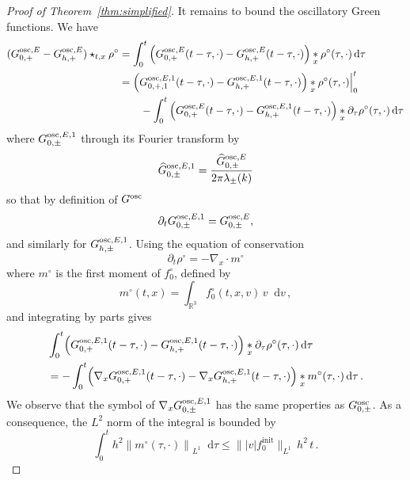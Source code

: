 \documentclass[a4paper,12pt]{amsart} %
\theoremstyle{plain}
\theoremstyle{definition}
\newcommand		{\RR}		{\mathbb R}			%
\newcommand		{\R}		{\RR}
\newcommand		{\Rd}		{\R^3}
\newcommand		{\lt}			{\left}				%
\newcommand		{\rt}			{\right}			%
\renewcommand	{\(}			{\lt(}
\renewcommand	{\)}			{\rt)}
\newcommand		{\n}[1]			{\lt\lvert{#1}\rt\rvert}	%
\newcommand		{\nrm}[1]		{\lt\lVert{#1}\rt\rVert}		%
\newcommand		{\snrm}[1]		{\lVert #1\rVert}
\newcommand		{\Nrm}[2]		{\nrm{#1}_{#2}}
\newcommand		{\sNrm}[2]		{\snrm{#1}_{#2}}
\renewcommand		{\d}		{\mathop{}\!\mathrm{d}}		%
\newcommand			{\Dx}		{\nabla_x}
\newcommand		{\intd}			{\int_{\Rd}}
\newcommand		{\init}			{\mathrm{init}}
\newcommand		{\Gosc}			{G^{\textnormal{osc}}}
\newcommand		{\GoscE}		{G^{\textnormal{osc},E}}
\newcommand		{\hatG}			{\widehat{G}}
\newcommand		{\hatGoscE}		{\hatG^{\textnormal{osc},E}}
\begin{document}
\begin{proof}[Proof of Theorem~\ref{thm:simplified}]
		It remains to bound the oscillatory Green functions. We have
		\begin{align*}
			(\GoscE_{0,+} - \GoscE_{h,+}) \star_{t,x} \rho^\circ
			&= \int_0^t \lt( \GoscE_{0,+}(t-\tau,\cdot) - \GoscE_{h,+}(t - \tau,\cdot) \rt) \underset{x}{*} \rho^\circ(\tau,\cdot) \d\tau
			\\
			&= \lt( G^{\textnormal{osc},E,1}_{0,+,1}(t-\tau,\cdot) - G^{\textnormal{osc},E,1}_{h,+}(t - \tau,\cdot) \rt) \underset{x}{*} \rho^\circ(\tau,\cdot)\Bigr|_0^t
			\\
			&\qquad - \int_0^t \lt( \GoscE_{0,+}(t-\tau,\cdot) - G^{\textnormal{osc},E,1}_{h,+}(t - \tau,\cdot) \rt) \underset{x}{*} \partial_\tau \rho^\circ(\tau,\cdot) \d\tau
		\end{align*}
		where $G^{\textnormal{osc},E,1}_{0,\pm}$ through its Fourier transform by
		\begin{equation*}
			\widehat G^{\textnormal{osc},E,1}_{0,\pm} = \frac{\hatGoscE_{0,\pm}}{2 \pi \lambda_\pm(k)}
		\end{equation*}
		so that by definition of $\Gosc$
		\begin{equation*}
			\partial_t G^{\textnormal{osc},E,1}_{0,\pm} = \GoscE_{0,\pm}, 
		\end{equation*}
		and similarly for $G^{\textnormal{osc},E,1}_{h,\pm}$. Using the equation of conservation
		\begin{equation*}
			\partial_t \rho^\circ = - \Dx \cdot m^\circ
		\end{equation*}
		where $m^\circ$ is the first moment of $f_0^\circ$, defined by
		\begin{equation*}
			m^\circ(t,x) = \intd f_0^\circ(t,x,v) \, v \d v \, ,
		\end{equation*}
		and integrating by parts gives
		\begin{align*}
			&\int_0^t \Bigl( G^{\textnormal{osc},E,1}_{0,+}(t-\tau,\cdot) - G^{\textnormal{osc},E,1}_{h,+}(t - \tau,\cdot) \Bigr) \underset{x}{*} \partial_\tau \rho^\circ(\tau,\cdot) \d\tau
			\\
			&= - \int_0^t \Bigl( \Dx G^{\textnormal{osc},E,1}_{0,+}(t-\tau,\cdot) - \Dx G^{\textnormal{osc},E,1}_{h,+}(t - \tau,\cdot) \Bigr) \underset{x}{*} m^\circ(\tau,\cdot) \d\tau \, .
		\end{align*}
		We observe that the symbol of $\Dx G^{\textnormal{osc},E,1}_{0,\pm}$ has the same properties as $\Gosc_{0,\pm}$. As a consequence, the $L^2$ norm of the integral is bounded by
		\begin{equation*}
			\int_0^t h^2 \Nrm{m^\circ(\tau,\cdot)}{L^1} \d\tau \leq \sNrm{\n{v} f_0^\init}{L^1} \, h^2 \, t \, .

\end{equation*}
\end{proof}
\end{document}
